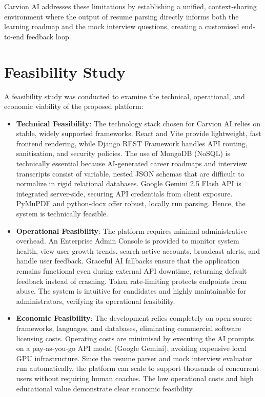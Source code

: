 \documentclass[12pt,a4paper]{article}
\begin{document}
Carvion AI addresses these limitations by establishing a unified, context-sharing environment where the output of resume parsing directly informs both the learning roadmap and the mock interview questions, creating a customised end-to-end feedback loop.

\clearpage

\section{Feasibility Study}

A feasibility study was conducted to examine the technical, operational, and economic viability of the proposed platform:

\begin{itemize}
    \item \textbf{Technical Feasibility}: The technology stack chosen for Carvion AI relies on stable, widely supported frameworks. React and Vite provide lightweight, fast frontend rendering, while Django REST Framework handles API routing, sanitisation, and security policies. The use of MongoDB (NoSQL) is technically essential because AI-generated career roadmaps and interview transcripts consist of variable, nested JSON schemas that are difficult to normalize in rigid relational databases. Google Gemini 2.5 Flash API is integrated server-side, securing API credentials from client exposure. PyMuPDF and python-docx offer robust, locally run parsing. Hence, the system is technically feasible.
    \item \textbf{Operational Feasibility}: The platform requires minimal administrative overhead. An Enterprise Admin Console is provided to monitor system health, view user growth trends, search active accounts, broadcast alerts, and handle user feedback. Graceful AI fallbacks ensure that the application remains functional even during external API downtime, returning default feedback instead of crashing. Token rate-limiting protects endpoints from abuse. The system is intuitive for candidates and highly maintainable for administrators, verifying its operational feasibility.
    \item \textbf{Economic Feasibility}: The development relies completely on open-source frameworks, languages, and databases, eliminating commercial software licensing costs. Operating costs are minimised by executing the AI prompts on a pay-as-you-go API model (Google Gemini), avoiding expensive local GPU infrastructure. Since the resume parser and mock interview evaluator run automatically, the platform can scale to support thousands of concurrent users without requiring human coaches. The low operational costs and high educational value demonstrate clear economic feasibility.
\end{itemize}
\end{document}
